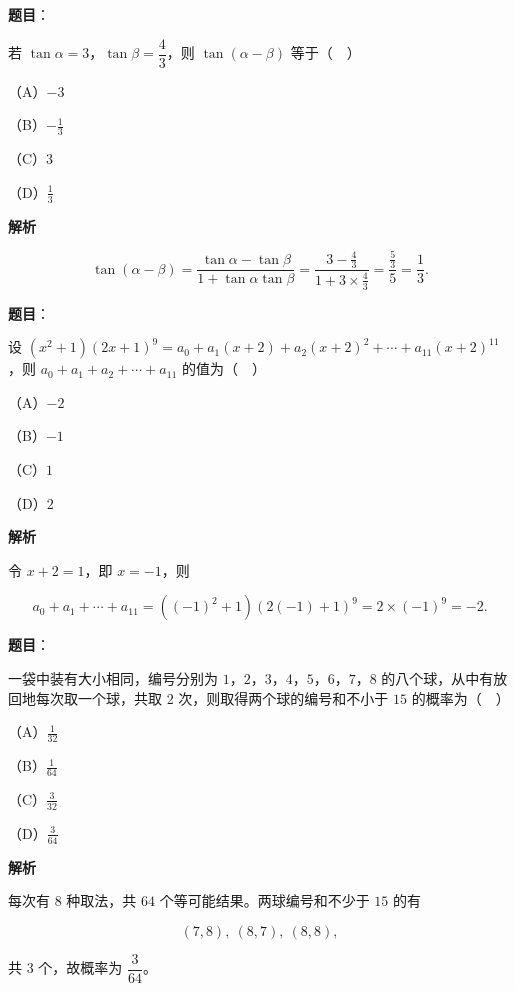 \begin{answer}

\textbf{题目}：

若 $\tan\alpha=3$，$\tan\beta=\dfrac43$，则 $\tan(\alpha-\beta)$ 等于（　）

（A）$-3$

（B）$-\frac13$

（C）$3$

（D）$\frac13$

\textbf{解析}

\nopagebreak[4]
\[\tan(\alpha-\beta)=\frac{\tan\alpha-\tan\beta}{1+\tan\alpha\tan\beta}=\frac{3-\frac43}{1+3\times\frac43}=\frac{\frac53}{5}=\frac13.\]


\end{answer}
\begin{answer}

\textbf{题目}：

设 $(x^2+1)(2x+1)^9=a_0+a_1(x+2)+a_2(x+2)^2+\cdots+a_{11}(x+2)^{11}$，则 $a_0+a_1+a_2+\cdots+a_{11}$ 的值为（　）

（A）$-2$

（B）$-1$

（C）$1$

（D）$2$

\textbf{解析}

令 $x+2=1$，即 $x=-1$，则

\nopagebreak[4]
\[a_0+a_1+\cdots+a_{11}=((-1)^2+1)(2(-1)+1)^9=2\times(-1)^9=-2.\]


\end{answer}
\begin{answer}

\textbf{题目}：

一袋中装有大小相同，编号分别为 $1$，$2$，$3$，$4$，$5$，$6$，$7$，$8$ 的八个球，从中有放回地每次取一个球，共取 $2$ 次，则取得两个球的编号和不小于 $15$ 的概率为（　）

（A）$\frac1{32}$

（B）$\frac1{64}$

（C）$\frac3{32}$

（D）$\frac3{64}$

\textbf{解析}

每次有 $8$ 种取法，共 $64$ 个等可能结果。两球编号和不少于 $15$ 的有

\nopagebreak[4]
\[(7,8),\ (8,7),\ (8,8),\]

共 $3$ 个，故概率为 $\dfrac3{64}$。


\end{answer}
